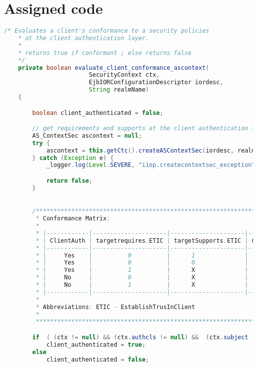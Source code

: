 \chapter{Assigned code}


\begin{lstlisting}[language=Java]
   /* Evaluates a client's conformance to a security policies
    * at the client authentication layer.
    *
    * returns true if conformant ; else returns false
    */
    private boolean evaluate_client_conformance_ascontext(
                        SecurityContext ctx,
                        EjbIORConfigurationDescriptor iordesc,
                        String realmName)
    {

        boolean client_authenticated = false;

        // get requirements and supports at the client authentication layer
        AS_ContextSec ascontext = null;
        try {
            ascontext = this.getCtc().createASContextSec(iordesc, realmName);
        } catch (Exception e) {
            _logger.log(Level.SEVERE, "iiop.createcontextsec_exception",e);

            return false;
        }
   

        /*************************************************************************
         * Conformance Matrix:
         *
         * |------------|---------------------|---------------------|------------|
         * | ClientAuth | targetrequires.ETIC | targetSupports.ETIC | Conformant |
         * |------------|---------------------|---------------------|------------|
         * |     Yes    |          0          |      1              |    Yes     |
         * |     Yes    |          0          |      0              |    No      |
         * |     Yes    |          1          |      X              |    Yes     |
         * |     No     |          0          |      X              |    Yes     |
         * |     No     |          1          |      X              |    No      |
         * |------------|---------------------|---------------------|------------|
         *
         * Abbreviations: ETIC - EstablishTrusInClient
         * 
         *************************************************************************/

        if  ( (ctx != null) && (ctx.authcls != null) &&  (ctx.subject != null))
            client_authenticated = true;
        else
            client_authenticated = false;


\end{lstlisting}
